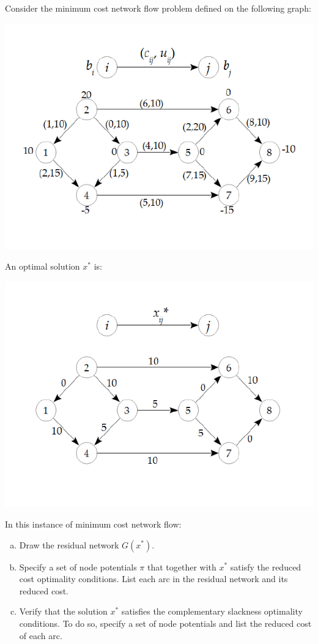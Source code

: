 \documentclass[fleqn]{homework}
\begin{document}
  \begin{problem}{4}
    \begin{question}
      Consider the minimum cost network flow problem defined on the following
      graph:

      \includegraphics{problem4-network.pdf}

      An optimal solution $x^*$ is:

      \includegraphics{problem4-flow.pdf}

      In this instance of minimum cost network flow:
      \begin{enumerate}[a.]
        \item Draw the residual network $G(x^*)$.
        \item Specify a set of node potentials $\pi$ that together with $x^*$
          satisfy the reduced cost optimality conditions.  List each arc in the
          residual network and its reduced cost.
        \item Verify that the solution $x^*$ satisfies the complementary
          slackness optimality conditions.  To do so, specify a set of node
          potentials and list the reduced cost of each arc.
      \end{enumerate}
    \end{question}


\end{problem}
\end{document}
